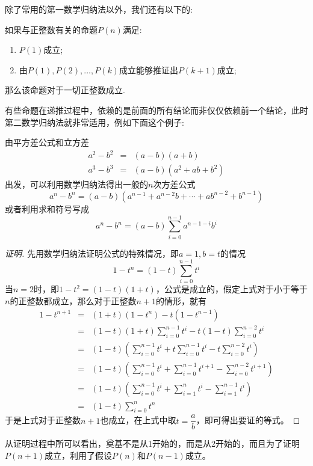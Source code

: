 除了常用的第一数学归纳法以外，我们还有以下的:
\begin{principle}[第二数学归纳法]
如果与正整数有关的命题$P(n)$满足:
  \begin{enumerate}
  \item $P(1)$成立;
  \item 由$P(1),P(2),\dots,P(k)$成立能够推证出$P(k+1)$成立;
  \end{enumerate}
那么该命题对于一切正整数成立.
\end{principle}
有些命题在递推过程中，依赖的是前面的所有结论而非仅仅依赖前一个结论，此时第二数学归纳法就非常适用，例如下面这个例子:

\begin{example}
  \label{example:a-power-n-b-power-n-factoring}
  由平方差公式和立方差
  \begin{eqnarray*}
    a^2-b^2 & = & (a-b)(a+b) \\
    a^3-b^3 & = & (a-b)(a^2+ab+b^2)
  \end{eqnarray*}
  出发，可以利用数学归纳法得出一般的$n$次方差公式
  \[ a^n - b^n = (a-b)(a^{n-1}+a^{n-2}b+\cdots+ab^{n-2}+b^{n-1}) \]
  或者利用求和符号写成
  \[ a^n-b^n = (a-b)\sum_{i=0}^{n-1}a^{n-1-i}b^i \]
  \begin{proof}[证明]
    先用数学归纳法证明公式的特殊情况，即$a=1,b=t$的情况
    \[ 1-t^n = (1-t)\sum_{i=0}^{n-1}t^i \]
    当$n=2$时，即$1-t^2=(1-t)(1+t)$，公式是成立的，假定上式对于小于等于$n$的正整数都成立，那么对于正整数$n+1$的情形，就有
    \begin{eqnarray*}
      1-t^{n+1} & = & (1+t)(1-t^n)-t(1-t^{n-1}) \\
                & = & (1-t)(1+t)\sum_{i=0}^{n-1}t^i - t(1-t)\sum_{i=0}^{n-2}t^i \\
                & = & (1-t) \left( \sum_{i=0}^{n-1}t^i + t\sum_{i=0}^{n-1}t^i -t\sum_{i=0}^{n-2}t^i \right) \\
                & = & (1-t) \left( \sum_{i=0}^{n-1}t^i + \sum_{i=0}^{n-1}t^{i+1} -\sum_{i=0}^{n-2}t^{i+1} \right) \\
                & = & (1-t) \left( \sum_{i=0}^{n-1}t^i + \sum_{i=1}^{n}t^{i} -\sum_{i=1}^{n-1}t^{i} \right) \\
      & = & (1-t)\sum_{i=0}^nt^n
    \end{eqnarray*}
    于是上式对于正整数$n+1$也成立，在上式中取$t=\dfrac{a}{b}$，即可得出要证的等式。
  \end{proof}

  从证明过程中所可以看出，奠基不是从1开始的，而是从2开始的，而且为了证明$P(n+1)$成立，利用了假设$P(n)$和$P(n-1)$成立。
\end{example}

